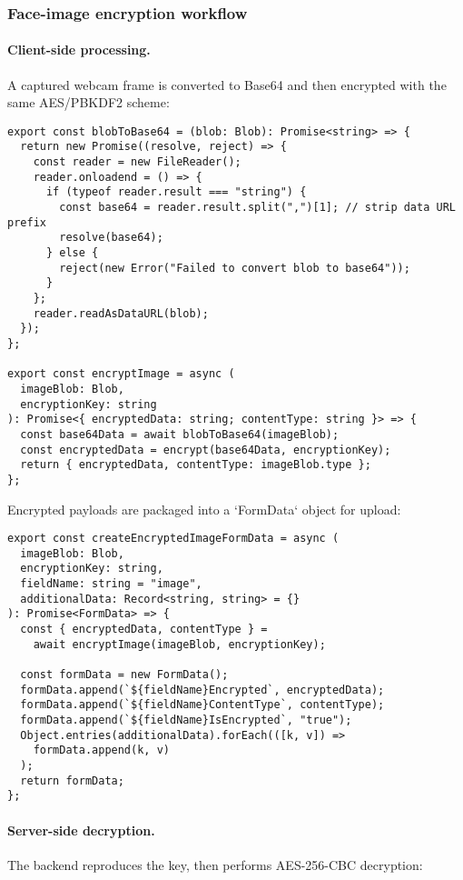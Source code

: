 \subsubsection{Face-image encryption workflow}

\paragraph{Client-side processing.}
A captured webcam frame is converted to Base64 and then encrypted with the same AES/PBKDF2 scheme:

\begin{verbatim}
export const blobToBase64 = (blob: Blob): Promise<string> => {
  return new Promise((resolve, reject) => {
    const reader = new FileReader();
    reader.onloadend = () => {
      if (typeof reader.result === "string") {
        const base64 = reader.result.split(",")[1]; // strip data URL prefix
        resolve(base64);
      } else {
        reject(new Error("Failed to convert blob to base64"));
      }
    };
    reader.readAsDataURL(blob);
  });
};

export const encryptImage = async (
  imageBlob: Blob,
  encryptionKey: string
): Promise<{ encryptedData: string; contentType: string }> => {
  const base64Data = await blobToBase64(imageBlob);
  const encryptedData = encrypt(base64Data, encryptionKey);
  return { encryptedData, contentType: imageBlob.type };
};
\end{verbatim}

Encrypted payloads are packaged into a `FormData` object for upload:

\begin{verbatim}
export const createEncryptedImageFormData = async (
  imageBlob: Blob,
  encryptionKey: string,
  fieldName: string = "image",
  additionalData: Record<string, string> = {}
): Promise<FormData> => {
  const { encryptedData, contentType } =
    await encryptImage(imageBlob, encryptionKey);

  const formData = new FormData();
  formData.append(`${fieldName}Encrypted`, encryptedData);
  formData.append(`${fieldName}ContentType`, contentType);
  formData.append(`${fieldName}IsEncrypted`, "true");
  Object.entries(additionalData).forEach(([k, v]) =>
    formData.append(k, v)
  );
  return formData;
};
\end{verbatim}

\paragraph{Server-side decryption.}
The backend reproduces the key, then performs AES-256-CBC decryption:


